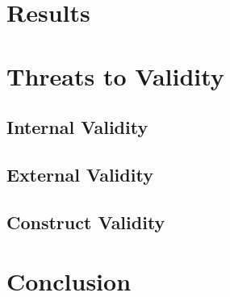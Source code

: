 \documentclass[sigconf,nonacm]{acmart}
\begin{document}
\section{Results}


\section{Threats to Validity}

\subsection{Internal Validity}

\subsection{External Validity}

\subsection{Construct Validity}

\section{Conclusion}




\end{document}

